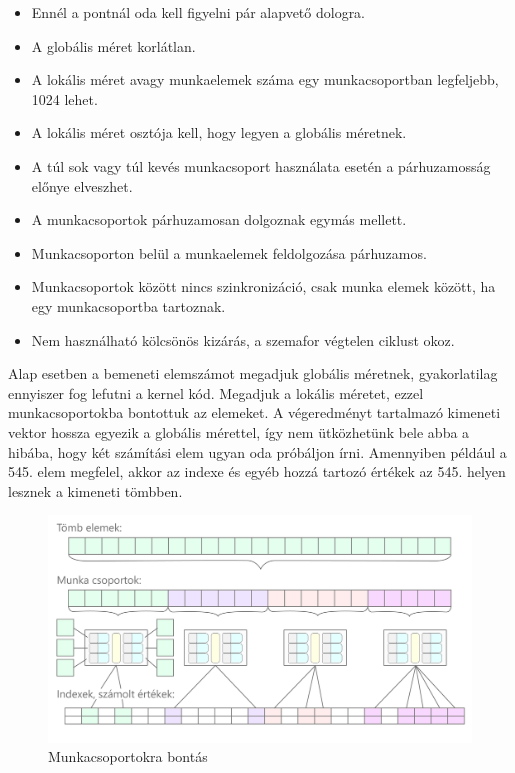 \begin{itemize}
\item Ennél a pontnál oda kell figyelni pár alapvető dologra.
\item A globális méret korlátlan.
\item A lokális méret avagy munkaelemek száma egy munkacsoportban legfeljebb, 1024 lehet.
\item A lokális méret osztója kell, hogy legyen a globális méretnek.
\item A túl sok vagy túl kevés munkacsoport használata esetén a párhuzamosság előnye elveszhet.
\item A munkacsoportok párhuzamosan dolgoznak egymás mellett.
\item Munkacsoporton belül a munkaelemek feldolgozása párhuzamos.
\item Munkacsoportok között nincs szinkronizáció, csak munka elemek között, ha egy munkacsoportba tartoznak.
\item Nem használható kölcsönös kizárás, a szemafor végtelen ciklust okoz.
\end{itemize}


Alap esetben a bemeneti elemszámot megadjuk globális méretnek, gyakorlatilag ennyiszer fog lefutni a kernel kód.
Megadjuk a lokális méretet, ezzel munkacsoportokba bontottuk az elemeket.
A végeredményt tartalmazó kimeneti vektor hossza egyezik a globális mérettel, így nem ütközhetünk bele abba a hibába, hogy két számítási elem ugyan oda próbáljon írni. Amennyiben például a 545. elem megfelel, akkor az indexe és egyéb hozzá tartozó értékek az 545. helyen lesznek a kimeneti tömbben.

\begin{figure}[h!]
\centering
\includegraphics[width=\textwidth]{images/workgroups.png}
\caption{Munkacsoportokra bontás}
\label{fig:opencl}
\end{figure}

